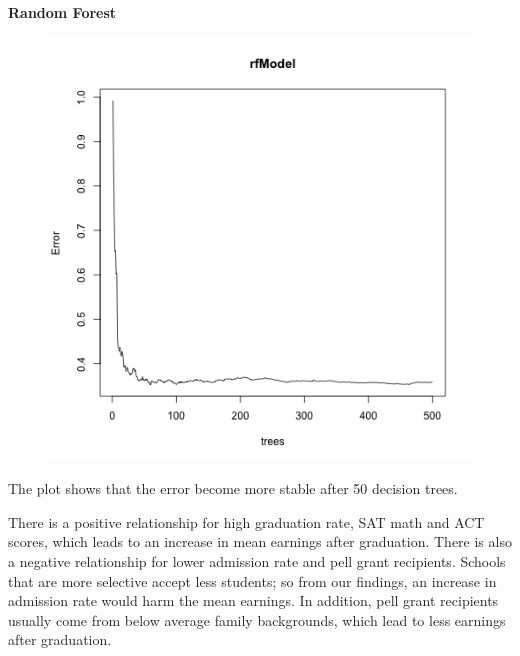 \documentclass{article}
\begin{document}
\textbf{Random Forest}\newline
\begin{figure}[h!]
\includegraphics{../images/rf_top.png}
\end{figure}
The plot shows that the error become more stable after 50 decision trees.



There is a positive relationship for high graduation rate, SAT math and ACT scores, which leads to an increase in mean earnings after graduation.  There is also a negative relationship for lower admission rate and pell grant recipients.  Schools that are more selective accept less students; so from our findings, an increase in admission rate would harm the mean earnings.  In addition, pell grant recipients usually come from below average family backgrounds, which lead to less earnings after graduation. 
\end{document}
